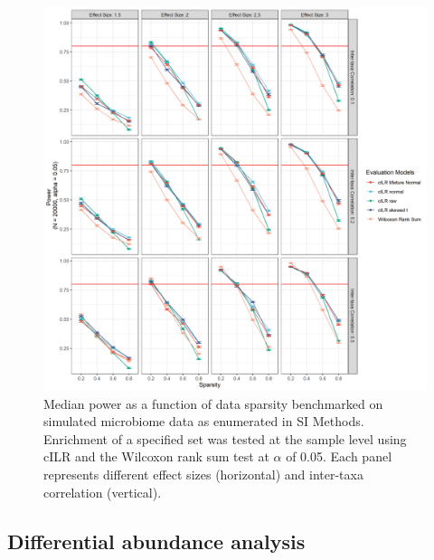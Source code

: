 \documentclass{article}
\begin{document}
\begin{figure}[H]
    \centering
    \includegraphics[scale=0.5]{figures/pwr_single_sample.png}
    \caption{Median power as a function of data sparsity benchmarked on simulated microbiome data as enumerated in SI Methods. Enrichment of a specified set was tested at the sample level using cILR and the Wilcoxon rank sum test at $\alpha$ of 0.05. Each panel represents different effect sizes (horizontal) and inter-taxa correlation (vertical).}
\end{figure}

\subsection*{Differential abundance analysis} 
\end{document}
